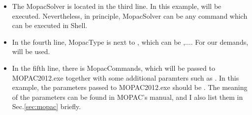 \documentclass[11pt]{JHEP3}
\begin{document}
\begin{itemize}
\item The MopacSolver is located in the third line. In this example,
 will be executed.
Nevertheless, in principle, MopacSolver can be any command which can
be executed in Shell.

\item In the fourth line, MopacType is next to
, which can be ,$\ldots$. For our demands,  will be used.

\item In the fifth line, there is MopacCommands, which will be
passed to MOPAC2012.exe together with some additional paramters such
as . In this example, the
parameters passed to MOPAC2012.exe should be . The meaning of the parameters can be found in MOPAC's
manual, and I also list them in Sec.\ref{sec:mopac} briefly.


\end{itemize}
\end{document}

